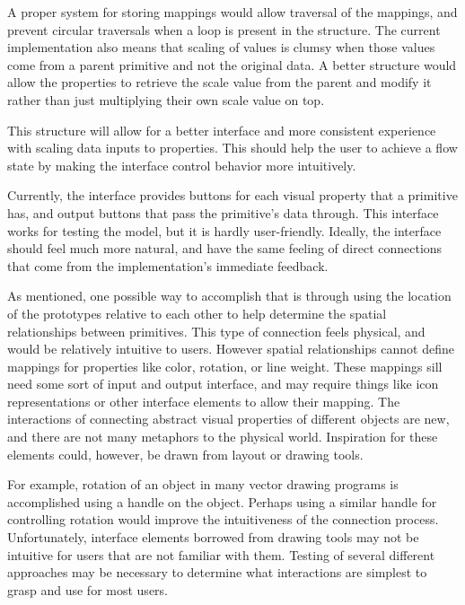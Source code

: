 A proper system for storing mappings would allow traversal of the mappings, and prevent circular traversals when a loop is present in the structure.
The current implementation also means that scaling of values is clumsy when those values come from a parent primitive and not the original data.
A better structure would allow the properties to retrieve the scale value from the parent and modify it rather than just multiplying their own scale value on top.

This structure will allow for a better interface and more consistent experience with scaling data inputs to properties.
This should help the user to achieve a flow state by making the interface control behavior more intuitively.

\label{primConnectionsFW}
Currently, the interface provides buttons for each visual property that a primitive has, and output buttons that pass the primitive's data through.
This interface works for testing the model, but it is hardly user-friendly.
Ideally, the interface should feel much more natural, and have the same feeling of direct connections that come from the implementation's immediate feedback.

As mentioned, one possible way to accomplish that is through using the location of the prototypes relative to each other to help determine the spatial relationships between primitives.
This type of connection feels physical, and would be relatively intuitive to users.
However spatial relationships cannot define mappings for properties like color, rotation, or line weight.
These mappings sill need some sort of input and output interface, and may require things like icon representations or other interface elements to allow their mapping.
The interactions of connecting abstract visual properties of different objects are new, and there are not many metaphors to the physical world.
Inspiration for these elements could, however, be drawn from layout or drawing tools.

For example, rotation of an object in many vector drawing programs is accomplished using a handle on the object.
Perhaps using a similar handle for controlling rotation would improve the intuitiveness of the connection process.
Unfortunately, interface elements borrowed from drawing tools may not be intuitive for users that are not familiar with them.
Testing of several different approaches may be necessary to determine what interactions are simplest to grasp and use for most users.

